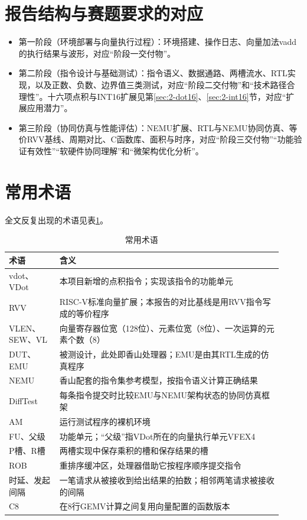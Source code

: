 \section*{报告结构与赛题要求的对应}
\begin{itemize}
\item 第一阶段（环境部署与向量执行过程）：环境搭建、操作日志、向量加法vadd的执行结果与波形，对应“阶段一交付物”。
\item 第二阶段（指令设计与基础测试）：指令语义、数据通路、两槽流水、RTL实现，以及正数、负数、边界值三类测试，对应“阶段二交付物”和“技术路径合理性”。十六项点积与INT16扩展见第\ref{sec:2-dot16}、\ref{sec:2-int16}节，对应“扩展应用潜力”。
\item 第三阶段（协同仿真与性能评估）：NEMU扩展、RTL与NEMU协同仿真、等价RVV基线、周期对比、C函数库、面积与时序，对应“阶段三交付物”“功能验证有效性”“软硬件协同理解”和“微架构优化分析”。
\end{itemize}

\section*{常用术语}
全文反复出现的术语见表\ref{tab:0-terms}。

\begin{table}[!htbp]\centering
\small
\caption{常用术语}\label{tab:0-terms}
\begin{tabular}{>{\raggedright\arraybackslash}p{0.17\linewidth}>{\raggedright\arraybackslash}p{0.75\linewidth}}
\toprule
术语 & 含义\\
\midrule
vdot、VDot & 本项目新增的点积指令；实现该指令的功能单元\\
RVV & RISC-V标准向量扩展；本报告的对比基线是用RVV指令写成的等价程序\\
VLEN、SEW、VL & 向量寄存器位宽（128位）、元素位宽（8位）、一次运算的元素个数（8）\\
DUT、EMU & 被测设计，此处即香山处理器；EMU是由其RTL生成的仿真程序\\
NEMU & 香山配套的指令集参考模型，按指令语义计算正确结果\\
DiffTest & 每条指令提交时比较EMU与NEMU架构状态的协同仿真框架\\
AM & 运行测试程序的裸机环境\\
FU、父级 & 功能单元；“父级”指VDot所在的向量执行单元VFEX4\\
P槽、R槽 & 两槽实现中保存乘积的槽和保存结果的槽\\
ROB & 重排序缓冲区，处理器借助它按程序顺序提交指令\\
时延、发起间隔 & 一笔请求从被接收到给出结果的拍数；相邻两笔请求被接收的间隔\\
C8 & 在8行GEMV计算之间复用向量配置的函数版本\\
\bottomrule
\end{tabular}
\end{table}
